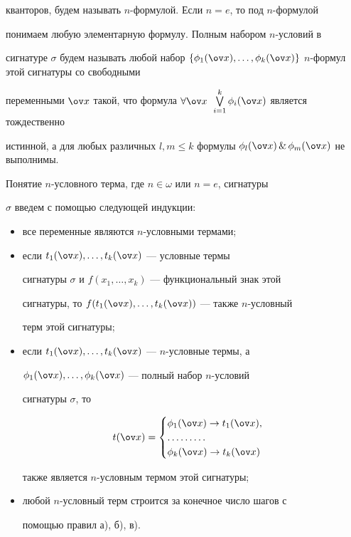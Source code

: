 кванторов, будем называть $n$-формулой. Если $n=e$, то под $n$-формулой 


понимаем любую элементарную формулу. Полным набором $n$-условий в 


сигнатуре $\sigma$ будем называть любой набор $\{\phi_1(\ov 


x),\dotsc,\phi_k(\ov x)\}$\; $n$-формул этой сигнатуры со свободными 


переменными $\ov x$ такой, что формула $\forall\ov 


x$~$\bigvee\limits^k_{i=1}\phi_i(\ov x)$ является тождественно 


истинной, а для любых различных $l,m\le k$ формулы $\phi_l(\ov 


x)\,\&\,\phi_m(\ov x)$ не выполнимы. 


 


\begin{defn} 


Понятие $n$-условного терма, где $n\in\omega$ или $n=e$, сигнатуры 


$\sigma$ введем с помощью следующей индукции: 


\begin{itemize} 


\item[а)] все переменные являются $n$-условными термами; 


\item[б)] если $t_1(\ov x),\dotsc,t_k(\ov x)$ --- условные термы 


сигнатуры $\sigma$ и $f(x_1,\dotsc,x_k)$ --- функциональный знак этой 


сигнатуры, то $f(t_1(\ov x),\dotsc,t_k(\ov x))$ --- также $n$-условный 


терм этой сигнатуры; 


\item[в)] если $t_1(\ov x),\dotsc,t_k(\ov x)$ --- $n$-условные термы, а 


$\phi_1(\ov x),\dotsc,\phi_k(\ov x)$ --- полный набор $n$-условий 


сигнатуры $\sigma$, то 


$$ 


t(\ov x)= 


\begin{cases} 


\phi_1(\ov x)\to t_1(\ov x),\\ 


\dotsc\dotsc\dotsc \\ 


\phi_k(\ov x)\to t_k(\ov x) 


\end{cases} 


$$ 


также является $n$-условным термом этой сигнатуры; 


\item[г)] любой $n$-условный терм строится за конечное число шагов с 


помощью правил а), б), в). 


\end{itemize} 


\end{defn}  


